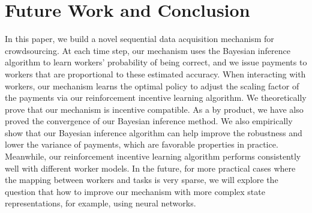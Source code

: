 \documentclass{article}
\theoremstyle{lemmas}
\begin{document}








\section{Future Work and Conclusion}
In this paper, we build a novel sequential data acquisition mechanism for crowdsourcing.
At each time step, our mechanism uses the Bayesian inference algorithm to learn workers' probability of being correct, and we issue payments to workers that are proportional to these estimated accuracy.
When interacting with workers, our mechanism learns the optimal policy to adjust the scaling factor of the payments via our reinforcement incentive learning algorithm.
We theoretically prove that our mechanism is incentive compatible. As a by product, we have also proved the convergence of our Bayesian inference method.
We also empirically show that our Bayesian inference algorithm can help improve the robustness and lower the variance of payments, which are favorable properties in practice.
Meanwhile, our reinforcement incentive learning algorithm performs consistently well with different worker models.
In the future, for more practical cases where the mapping between workers and tasks is very sparse, we will explore the question that how to improve our mechanism with more complex state representations, for example, using neural networks.



\end{document}
